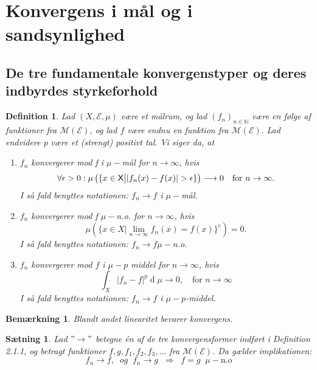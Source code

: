 \documentclass{article}
\newcommand{\N}{\mathbb{N}}
\newcommand{\1}{\mathbbm{1}}
\newcommand{\X}{\mathsf{X}}
\newcommand{\deriv}{\operatorname{d}}
\newtheorem{definition}[theorem]{Definition}
\newtheorem{remark}[theorem]{Bemærkning}
\newtheorem{proposition}[theorem]{Sætning}
\theoremstyle{boxed}
\begin{document}
\section{Konvergens i mål og i sandsynlighed}
\subsection{De tre fundamentale konvergenstyper og deres indbyrdes styrkeforhold}
\begin{theorem-box}
    \begin{definition}
        Lad $(X,\mathcal{E}, \mu)$ være et målrum, og lad $(f_n)_{n\in\N}$ være en følge af funktioner fra $\mathcal{M}(\mathcal{E})$, og lad $f$ være endnu en funktion fra $\mathcal{M}(\mathcal{E}).$ Lad endvidere p være et (strengt) positivt tal. Vi siger da, at 
        \begin{enumerate}
            \item[\textnormal{(a)}] $f_n$ konvergerer mod f i $\mu-$mål for $n\rightarrow \infty$, hvis $$\forall\epsilon>0:\mu\left(\{x\in\X\big{|}|f_n(x)-f(x)|>\epsilon\}\right)\longrightarrow 0 \quad \text{for }n\rightarrow \infty.$$
            I så fald benyttes notationen: $f_n\rightarrow f$ i $\mu-$mål.
            \item[\textnormal{(b)}] $f_n$ konvergerer mod f $\mu-$n.o. for $n\rightarrow\infty$, hvis $$\mu\left(\{x\in X|\lim_{n\rightarrow \infty}f_n(x)=f(x)\}^c\right)=0.$$
            I så fald benyttes notationen: $f_n\rightarrow f \mu-$n.o.
            \item[\textnormal{(c)}] $f_n$ konvergerer mod $f$ i $\mu-p$ middel for $n\rightarrow \infty$, hvis 
            $$\int_X|f_n-f|^p\deriv\mu\longrightarrow 0, \quad \text{for }n\rightarrow \infty$$
            I så fald benyttes notationen: $f_n\rightarrow f$ i $\mu-p$-middel.
        \end{enumerate}
    \end{definition}
\end{theorem-box}
\begin{remark}
    Blandt andet linearitet bevarer konvergens.
\end{remark}
\begin{theorem-box}
    \begin{proposition}
        Lad $"\rightarrow"$ betegne én af de tre konvergensformer indført i Definition 2.1.1, og betragt funktioner $f,g,f_1,f_2,f_3,\dots$ fra $\mathcal{M}(\mathcal{E})$. Da gælder implikationen:
        $$f_n\longrightarrow f, \;\; og \;\; f_n\longrightarrow g \;\;\Longrightarrow\;\;f=g\;\; \mu-\text{n.o}$$
    \end{proposition}
\end{theorem-box}
\end{document}

